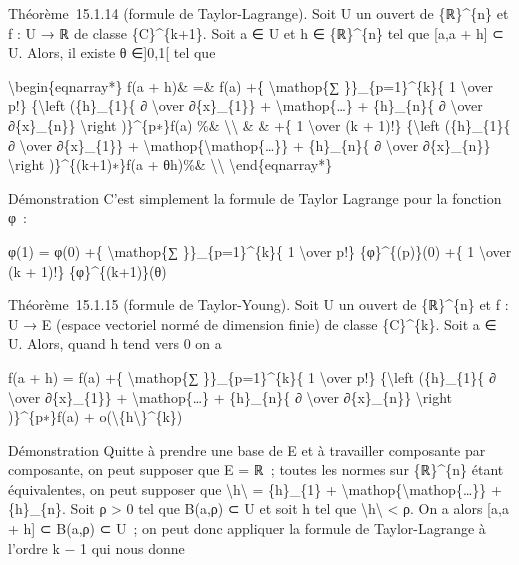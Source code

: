 \documentclass[]{article}
\begin{document}
Théorème~15.1.14 (formule de Taylor-Lagrange). Soit U un ouvert de
\{ℝ\}\^{}\{n\} et f : U → ℝ de classe \{C\}\^{}\{k+1\}. Soit a ∈ U et h
∈ \{ℝ\}\^{}\{n\} tel que {[}a,a + h{]} ⊂ U. Alors, il existe θ
∈{]}0,1{[} tel que

\textbackslash{}begin\{eqnarray*\} f(a + h)\& =\& f(a) +\{
\textbackslash{}mathop\{∑ \}\}\_\{p=1\}\^{}\{k\}\{ 1
\textbackslash{}over p!\} \{\textbackslash{}left (\{h\}\_\{1\}\{ ∂
\textbackslash{}over ∂\{x\}\_\{1\}\} +
\textbackslash{}mathop\{\ldots{}\} + \{h\}\_\{n\}\{ ∂
\textbackslash{}over ∂\{x\}\_\{n\}\} \textbackslash{}right
)\}\^{}\{p∗\}f(a) \%\& \textbackslash{}\textbackslash{} \& \& +\{ 1
\textbackslash{}over (k + 1)!\} \{\textbackslash{}left (\{h\}\_\{1\}\{ ∂
\textbackslash{}over ∂\{x\}\_\{1\}\} +
\textbackslash{}mathop\{\textbackslash{}mathop\{\ldots{}\}\} +
\{h\}\_\{n\}\{ ∂ \textbackslash{}over ∂\{x\}\_\{n\}\}
\textbackslash{}right )\}\^{}\{(k+1)∗\}f(a + θh)\%\&
\textbackslash{}\textbackslash{} \textbackslash{}end\{eqnarray*\}

Démonstration C'est simplement la formule de Taylor Lagrange pour la
fonction φ~:

φ(1) = φ(0) +\{ \textbackslash{}mathop\{∑ \}\}\_\{p=1\}\^{}\{k\}\{ 1
\textbackslash{}over p!\} \{φ\}\^{}\{(p)\}(0) +\{ 1 \textbackslash{}over
(k + 1)!\} \{φ\}\^{}\{(k+1)\}(θ)

Théorème~15.1.15 (formule de Taylor-Young). Soit U un ouvert de
\{ℝ\}\^{}\{n\} et f : U → E (espace vectoriel normé de dimension finie)
de classe \{C\}\^{}\{k\}. Soit a ∈ U. Alors, quand h tend vers 0 on a

f(a + h) = f(a) +\{ \textbackslash{}mathop\{∑ \}\}\_\{p=1\}\^{}\{k\}\{ 1
\textbackslash{}over p!\} \{\textbackslash{}left (\{h\}\_\{1\}\{ ∂
\textbackslash{}over ∂\{x\}\_\{1\}\} +
\textbackslash{}mathop\{\ldots{}\} + \{h\}\_\{n\}\{ ∂
\textbackslash{}over ∂\{x\}\_\{n\}\} \textbackslash{}right
)\}\^{}\{p∗\}f(a) +
o(\textbackslash{}\textbar{}\{h\textbackslash{}\textbar{}\}\^{}\{k\})

Démonstration Quitte à prendre une base de E et à travailler composante
par composante, on peut supposer que E = ℝ~; toutes les normes sur
\{ℝ\}\^{}\{n\} étant équivalentes, on peut supposer que
\textbackslash{}\textbar{}h\textbackslash{}\textbar{} =
\textbar{}\{h\}\_\{1\}\textbar{} +
\textbackslash{}mathop\{\textbackslash{}mathop\{\ldots{}\}\} +
\textbar{}\{h\}\_\{n\}\textbar{}. Soit ρ \textgreater{} 0 tel que B(a,ρ)
⊂ U et soit h tel que
\textbackslash{}\textbar{}h\textbackslash{}\textbar{} \textless{} ρ. On
a alors {[}a,a + h{]} ⊂ B(a,ρ) ⊂ U~; on peut donc appliquer la formule
de Taylor-Lagrange à l'ordre k − 1 qui nous donne
\end{document}
